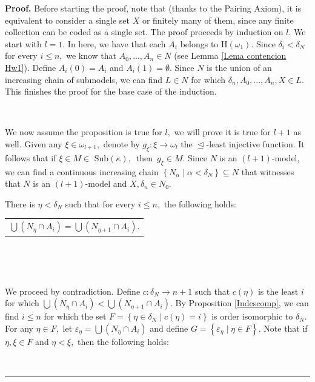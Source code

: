 \documentclass[10pt,a4paper]{amsart}
\newenvironment{proof}[1][Proof]{\noindent\textbf{#1.} }{\ \rule{0.5em}{0.5em}}
\begin{document}
\begin{proof}
Before starting the proof, note that (thanks to the Pairing Axiom), it is
equivalent to consider a single set $X$ or finitely many of them, since any
finite collection can be coded as a single set. The proof proceeds by
induction on $l.$ We start with $l=1.$ In here, we have that each $A_{i}$
belongs to \textsf{H}$\left(  \omega_{1}\right)  .$ Since $\delta_{i}%
<\delta_{N}$ for every $i\leq n,$ we know that $A_{0},...,A_{n}\in N$ (see
Lemma \ref{Lema contencion Hw1}). Define $A_{i}\left(  0\right)  =A_{i}$ and
$A_{i}\left(  1\right)  =\emptyset$. Since $N$ is the union of an increasing
chain of submodels, we can find $L\in N$ for which $\delta_{n},A_{0}%
,...,A_{n},X\in L.$ This finishes the proof for the base case of the induction.

\qquad\qquad\qquad\ \ \ \ 

We now assume the proposition is true for $l,$ we will prove it is true for
$l+1$ as well. Given any $\xi\in\omega_{l+1},$ denote by $g_{\xi}%
:\xi\longrightarrow\omega_{l}$ the $\trianglelefteq$-least injective function.
It follows that if $\xi\in M\in$ \textsf{Sub}$\left(  \kappa\right)
,$\ then\ $g_{\xi}\in M$. Since $N$ is an $\left(  l+1\right)  $-model, we can
find a continuous increasing chain $\left\{  N_{\alpha}\mid\alpha<\delta
_{N}\right\}  \subseteq N$ that witnesses that $N$ is an $\left(  l+1\right)
$-model and $X,\delta_{n}\in N_{0}.$

\begin{claim}
There is $\eta<\delta_{N}$ such that for every $i\leq n,$ the following
holds:\medskip

\hfill%
\begin{tabular}
[c]{l}%
$%
{\displaystyle\bigcup}
\left(  N_{\eta}\cap A_{i}\right)  =%
{\displaystyle\bigcup}
\left(  N_{\eta+1}\cap A_{i}\right)  .$%
\end{tabular}
\qquad\qquad\ \qquad\qquad\qquad\hfill
\end{claim}

\qquad\ \ \ \qquad\ \ \ 

We proceed by contradiction. Define $c:\delta_{N}\longrightarrow n+1$ such
that $c\left(  \eta\right)  $ is the least $i$ for which $%
{\displaystyle\bigcup}
\left(  N_{\eta}\cap A_{i}\right)  <%
{\displaystyle\bigcup}
\left(  N_{\eta+1}\cap A_{i}\right)  .$ By Proposition \ref{Indescomp}, we can
find $i\leq n$ for which the set $F=\left\{  \eta\in\delta_{N}\mid c\left(
\eta\right)  =i\right\}  $ is order isomorphic to $\delta_{N}.$ For any
$\eta\in F,$ let $\varepsilon_{\eta}=%
{\displaystyle\bigcup}
\left(  N_{\eta}\cap A_{i}\right)  $ and define $G=\left\{  \varepsilon_{\eta
}\mid\eta\in F\right\}  .$ Note that if $\eta,\xi\in F$ and $\eta<\xi,$ then
the following holds:\medskip


\end{proof}
\end{document}
